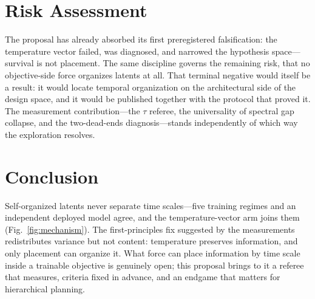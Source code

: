 \documentclass[11pt]{article}
\begin{document}
\section{Risk Assessment}

The proposal has already absorbed its first preregistered falsification: the temperature vector failed, was diagnosed, and narrowed the hypothesis space---survival is not placement. The same discipline governs the remaining risk, that no objective-side force organizes latents at all. That terminal negative would itself be a result: it would locate temporal organization on the architectural side of the design space, and it would be published together with the protocol that proved it. The measurement contribution---the $\tau$ referee, the universality of spectral gap collapse, and the two-dead-ends diagnosis---stands independently of which way the exploration resolves.

\section{Conclusion}

Self-organized latents never separate time scales---five training regimes and an independent deployed model agree, and the temperature-vector arm joins them (Fig.~\ref{fig:mechanism}). The first-principles fix suggested by the measurements redistributes variance but not content: temperature preserves information, and only placement can organize it. What force can place information by time scale inside a trainable objective is genuinely open; this proposal brings to it a referee that measures, criteria fixed in advance, and an endgame that matters for hierarchical planning.



\end{document}
